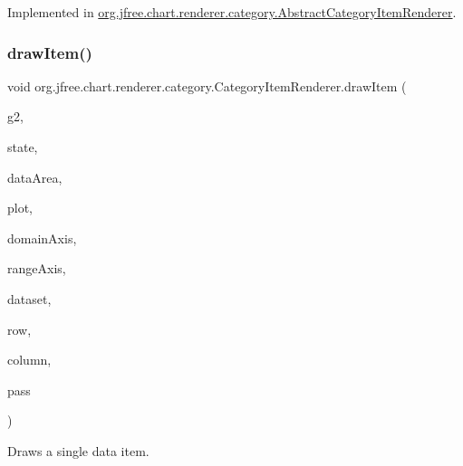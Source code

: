 Implemented in \mbox{\hyperlink{classorg_1_1jfree_1_1chart_1_1renderer_1_1category_1_1_abstract_category_item_renderer_aef7f446c08d3328c8abd9fd45ef891e4}{org.\+jfree.\+chart.\+renderer.\+category.\+Abstract\+Category\+Item\+Renderer}}.

\mbox{\label{interfaceorg_1_1jfree_1_1chart_1_1renderer_1_1category_1_1_category_item_renderer_ac18a046a47d2b991ab2c968ce3363aea}} 
\subsubsection{\texorpdfstring{draw\+Item()}{drawItem()}}
{\footnotesize\ttfamily void org.\+jfree.\+chart.\+renderer.\+category.\+Category\+Item\+Renderer.\+draw\+Item (\begin{DoxyParamCaption}\item[{Graphics2D}]{g2,  }\item[{\mbox{\hyperlink{classorg_1_1jfree_1_1chart_1_1renderer_1_1category_1_1_category_item_renderer_state}{Category\+Item\+Renderer\+State}}}]{state,  }\item[{Rectangle2D}]{data\+Area,  }\item[{\mbox{\hyperlink{classorg_1_1jfree_1_1chart_1_1plot_1_1_category_plot}{Category\+Plot}}}]{plot,  }\item[{\mbox{\hyperlink{classorg_1_1jfree_1_1chart_1_1axis_1_1_category_axis}{Category\+Axis}}}]{domain\+Axis,  }\item[{\mbox{\hyperlink{classorg_1_1jfree_1_1chart_1_1axis_1_1_value_axis}{Value\+Axis}}}]{range\+Axis,  }\item[{\mbox{\hyperlink{interfaceorg_1_1jfree_1_1data_1_1category_1_1_category_dataset}{Category\+Dataset}}}]{dataset,  }\item[{int}]{row,  }\item[{int}]{column,  }\item[{int}]{pass }\end{DoxyParamCaption})}

Draws a single data item.


